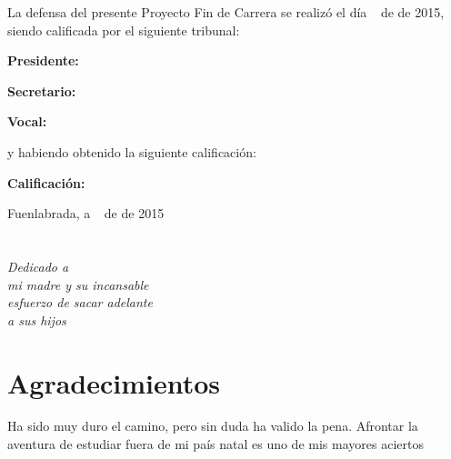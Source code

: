\documentclass[a4paper, 12pt]{book}
\begin{document}
\vspace{1cm}
La defensa del presente Proyecto Fin de Carrera se realizó el día \qquad$\;\,$ 
de \qquad\qquad\qquad\qquad \newline de 2015, siendo calificada por el siguiente tribunal:


\vspace{0.5cm}
\textbf{Presidente:}

\vspace{1.2cm}
\textbf{Secretario:}

\vspace{1.2cm}
\textbf{Vocal:}


\vspace{1.2cm}
y habiendo obtenido la siguiente calificación:

\vspace{1cm}
\textbf{Calificación:}


\vspace{1cm}
\begin{flushright}
Fuenlabrada, a \qquad$\;\,$ de \qquad\qquad\qquad\qquad de 2015
\end{flushright}



\chapter*{}
\begin{flushright}
\textit{Dedicado a \\
mi madre y su incansable  \\
esfuerzo de sacar adelante \\
a sus hijos}
\end{flushright}


\chapter*{Agradecimientos}

Ha sido muy duro el camino, pero sin duda ha valido la pena. Afrontar la aventura de
estudiar fuera de mi país natal es uno de mis mayores aciertos
\end{document}
